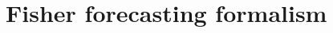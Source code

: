 \documentclass[twocolumn]{aastex63}
\newcommand{\blue}[1]{\textcolor{deepblue}{\bf #1}}
\begin{document}



\section{Fisher forecasting formalism}
\label{sec:fisher}
\end{document}
